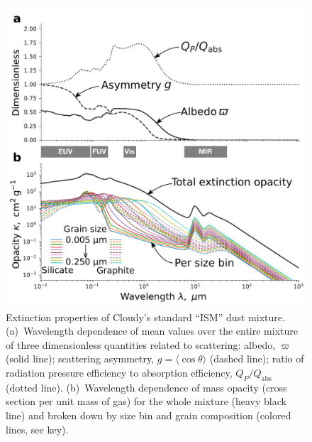 



\begin{figure}
  \centering
  \includegraphics[width=\linewidth]{figs/cloudy-ism-dust-opacity}
  \caption{Extinction properties of Cloudy's standard ``ISM'' dust
    mixture. %
    (a)~Wavelength dependence of mean values over the entire mixture
    of three dimensionless quantities related to scattering: albedo,
    \(\varpi\) (solid line); scattering asymmetry,
    \(g = \langle \cos\theta \rangle\) (dashed line); ratio of radiation pressure
    efficiency to absorption efficiency, \(Q_P / Q_{\text{abs}}\)
    (dotted line).
    (b)~Wavelength dependence of mass opacity (cross section per unit
    mass of gas) for the whole mixture (heavy black line) and broken
    down by size bin and grain composition (colored lines, see key). }
  \label{fig:cloudy-ism-dust-opacity}
\end{figure}

